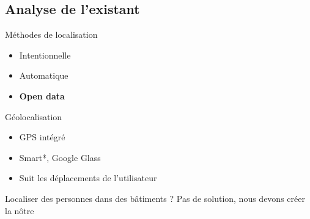 \documentclass{beamer} %
\begin{document}
  \subsection{Analyse de l'existant}
  \begin{frame}{\subsecname}
    \begin{block}{Méthodes de localisation}
      \begin{itemize}
        \item Intentionnelle
        \item Automatique
        \item \textbf{Open data}
      \end{itemize}  
    \end{block}
    
    \begin{block}{Géolocalisation}
      \begin{itemize}
        \item GPS intégré
        \item Smart*, Google Glass
        \item Suit les déplacements de l'utilisateur
      \end{itemize}
    \end{block}

    \pause

    \begin{alertblock}{Localiser des personnes dans des bâtiments ?}
      Pas de solution, nous devons créer la nôtre
    \end{alertblock}
    
  \end{frame}
\end{document}
